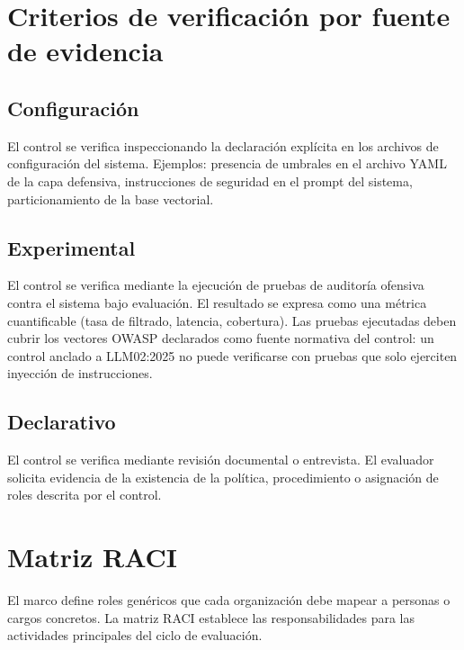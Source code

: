 
\section{Criterios de verificación por fuente de evidencia}
\label{sec:criterios-verificacion}

\subsection{Configuración}

El control se verifica inspeccionando la declaración explícita en los archivos de configuración del sistema. Ejemplos: presencia de umbrales en el archivo YAML de la capa defensiva, instrucciones de seguridad en el prompt del sistema, particionamiento de la base vectorial.

\subsection{Experimental}

El control se verifica mediante la ejecución de pruebas de auditoría ofensiva contra el sistema bajo evaluación. El resultado se expresa como una métrica cuantificable (tasa de filtrado, latencia, cobertura). Las pruebas ejecutadas deben cubrir los vectores OWASP declarados como fuente normativa del control: un control anclado a LLM02:2025 no puede verificarse con pruebas que solo ejerciten inyección de instrucciones.

\subsection{Declarativo}
\label{sec:crit-declarativo}

El control se verifica mediante revisión documental o entrevista. El evaluador solicita evidencia de la existencia de la política, procedimiento o asignación de roles descrita por el control.


\section{Matriz RACI}
\label{sec:raci}

El marco define roles genéricos que cada organización debe mapear a personas o cargos concretos. La matriz RACI establece las responsabilidades para las actividades principales del ciclo de evaluación.

